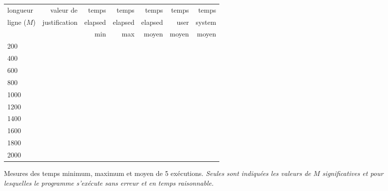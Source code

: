 \documentclass[a4paper,10pt,french]{article}
\begin{document}
    \begin{figure}[h]
      \begin{center}
        \begin{tabular}{|l||r||r|r|r||r||r||}
          \hline
          \hline
            longueur    & valeur    de       & temps     & temps   & temps  & temps & temps \\
            ligne ($M$) & justification      & elapsed   & elapsed & elapsed& user  & system \\
                        &                    & min       & max     & moyen  & moyen & moyen \\
          \hline
          \hline
            200  &      &     &     &   &  &  \\
          \hline
            400 &      &     &     &   &  &  \\
          \hline
            600 &      &     &     &   &  &  \\
          \hline
            800 &      &     &     &   &  &  \\
          \hline
            1000 &      &     &     &  &  &   \\
          \hline
            1200 &      &     &     &  &  &   \\
          \hline
            1400 &      &     &     &  &  &   \\
          \hline
            1600 &      &     &     &  &  &   \\
          \hline
            1800 &      &     &     &  &  &   \\
          \hline
            2000 &      &     &     &  &  &   \\
          \hline
          \hline
        \end{tabular}
        \caption{Mesures des temps minimum, maximum et moyen de 5 exécutions.
{\em Seules sont indiquées les valeurs de $M$ significatives et pour lesquelles le programme s'exécute sans erreur et en temps raisonnable.} }
        \label{table-temps}
      \end{center}
    \end{figure}

\end{document}
